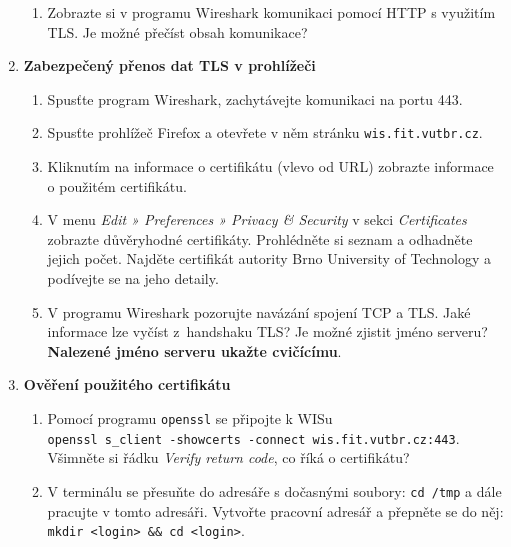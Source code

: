 \documentclass[a4paper,11pt]{article}
\begin{document}
\begin{enumerate}
\begin{enumerate}
      \item Zobrazte si v programu Wireshark komunikaci pomocí HTTP s využitím
        TLS. Je možné přečíst obsah komunikace?

    \end{enumerate}

  \item {\bf Zabezpečený přenos dat TLS v prohlížeči}

    \begin{enumerate}

      \item Spusťte program Wireshark, zachytávejte komunikaci na portu 443.

      \item Spusťte prohlížeč Firefox a otevřete v něm stránku
        \verb|wis.fit.vutbr.cz|.

      \item Kliknutím na informace o certifikátu (vlevo od URL) zobrazte
        informace o použitém certifikátu.

      \item V menu \emph{Edit » Preferences » Privacy \& Security} v sekci
        \emph{Certificates} zobrazte důvěryhodné certifikáty. Prohlédněte si
        seznam a odhadněte jejich počet. Najděte certifikát autority Brno
        University of Technology a podívejte se na jeho detaily.

      \item V programu Wireshark pozorujte navázání spojení TCP a TLS. Jaké
        informace lze vyčíst z~handshaku TLS? Je možné zjistit jméno serveru?
        {\bf Nalezené jméno serveru ukažte cvičícímu}.

    \end{enumerate}

  \item {\bf Ověření použitého certifikátu}

    \begin{enumerate}

      \item Pomocí programu {\tt openssl} se připojte k WISu \\
        \verb|openssl s_client -showcerts -connect wis.fit.vutbr.cz:443|. \\
        Všimněte si řádku \emph{Verify return code}, co
        říká o certifikátu?

      \item V terminálu se přesuňte do adresáře s dočasnými soubory:
        \verb|cd /tmp| a dále pracujte v tomto adresáři. Vytvořte pracovní
        adresář a přepněte se do něj: \verb|mkdir <login> && cd <login>|.


\end{enumerate}
\end{enumerate}
\end{document}
